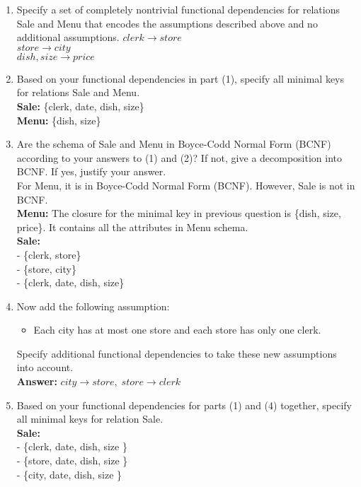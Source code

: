 \documentclass[paper=a4, fontsize=11pt]{scrartcl}
\numberwithin{equation}{section}		%
\numberwithin{figure}{section}			%
\numberwithin{table}{section}				%
\begin{document}
\begin{enumerate}
\item Specify a set of completely nontrivial functional dependencies for relations Sale and Menu that encodes the assumptions described above and no additional assumptions.
$clerk \rightarrow store$\\
$store \rightarrow city$\\
$dish, size \rightarrow price$\\

\item Based on your functional dependencies in part (1), specify all minimal keys for relations Sale and Menu.\\
\textbf{Sale: } \{clerk, date, dish, size\}\\
\textbf{Menu: } \{dish, size\}

\item Are the schema of Sale and Menu in Boyce-Codd Normal Form (BCNF) according to
your answers to (1) and (2)? If not, give a decomposition into BCNF. If yes, justify your answer.\\
For Menu, it is in Boyce-Codd Normal Form (BCNF). However, Sale is not in BCNF.\\
\textbf{Menu: } The closure for the minimal key in previous question is \{dish, size, price\}. It contains all the attributes in Menu schema.\\
\textbf{Sale: }\\
- \{clerk, store\}\\
- \{store, city\}\\
- \{clerk, date, dish, size\}

\item Now add the following assumption:

\begin{itemize}
\item Each city has at most one store and each store has only one clerk.
\end{itemize}
Specify additional functional dependencies to take these new assumptions into account.\\
\textbf{Answer: }$city \rightarrow store,\;store \rightarrow clerk$

\item Based on your functional dependencies for parts (1) and (4) together, specify all minimal keys for relation Sale.\\
\textbf{Sale: }\\
- \{clerk, date, dish, size \}\\
- \{store, date, dish, size \}\\
- \{city, date, dish, size \}\\


\end{enumerate}
\end{document}
